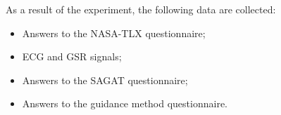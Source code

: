 As a result of the experiment, the following data are collected:

\begin{itemize}
    \item Answers to the NASA-TLX questionnaire;
    \item ECG and GSR signals;
    \item Answers to the SAGAT questionnaire;
    \item Answers to the guidance method questionnaire.
\end{itemize}